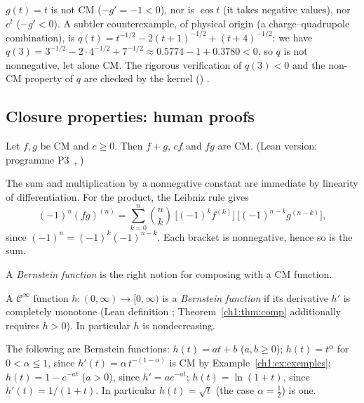 \begin{example}[Counterexamples]\label{ch1:ex:contre}
$g(t)=t$ is not CM ($-g'=-1<0$), nor is $\cos t$ (it takes negative values), nor $e^{t}$ ($-g'<0$).
A subtler counterexample, of physical origin (a charge--quadrupole combination), is
$q(t)=t^{-1/2}-2(t+1)^{-1/2}+(t+4)^{-1/2}$: we have $q(3)=3^{-1/2}-2\cdot4^{-1/2}+7^{-1/2}\approx0.5774-1+0.3780<0$,
so $q$ is not nonnegative, let alone CM. The rigorous verification of $q(3)<0$ and the non-CM property of $q$ are checked by the kernel
() \tierA{}.
\end{example}

\subsection{Closure properties: human proofs}

\begin{proposition}\label{ch1:prop:cloture}
Let $f,g$ be CM and $c\ge0$. Then $f+g$, $cf$ and $fg$ are CM. \tierC{} (Lean version: programme P3~\cite{p3}, \tierA{})
\end{proposition}

\begin{humanproof}
The sum and multiplication by a nonnegative constant are immediate by linearity of differentiation.
For the product, the Leibniz rule gives
\[
  (-1)^n(fg)^{(n)}=\sum_{k=0}^{n}\binom nk\ \bigl[(-1)^kf^{(k)}\bigr]\ \bigl[(-1)^{n-k}g^{(n-k)}\bigr],
\]
since $(-1)^n=(-1)^k(-1)^{n-k}$. Each bracket is nonnegative, hence so is the sum.
\end{humanproof}

A \emph{Bernstein function} is the right notion for composing with a CM function.

\begin{definition}\label{ch1:def:bernstein}
A $\mathcal C^\infty$ function $h:(0,\infty)\to[0,\infty)$ is a \emph{Bernstein function} if its derivative $h'$ is completely monotone
(Lean definition ; Theorem~\ref{ch1:thm:comp} additionally requires $h>0$). In particular $h$ is nondecreasing.
\end{definition}

\begin{example}\label{ch1:ex:bernstein}
The following are Bernstein functions: $h(t)=at+b$ ($a,b\ge0$); $h(t)=t^\alpha$ for $0<\alpha\le1$, since
$h'(t)=\alpha\,t^{-(1-\alpha)}$ is CM by Example~\ref{ch1:ex:exemples}; $h(t)=1-e^{-at}$ ($a>0$), since $h'=ae^{-at}$; $h(t)=\ln(1+t)$,
since $h'(t)=1/(1+t)$. In particular $h(t)=\sqrt t$ (the case $\alpha=\frac12$) is one. \tierC{}
\end{example}

